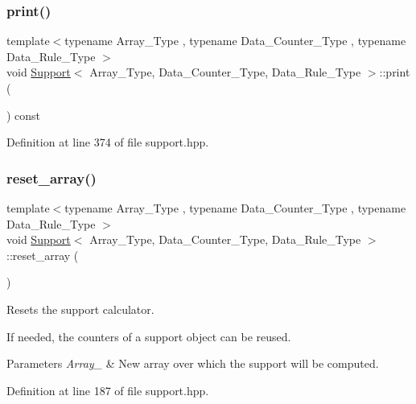 \subsubsection{\texorpdfstring{print()}{print()}}
{\footnotesize\ttfamily template$<$typename Array\+\_\+\+Type , typename Data\+\_\+\+Counter\+\_\+\+Type , typename Data\+\_\+\+Rule\+\_\+\+Type $>$ \\
void \hyperlink{class_support}{Support}$<$ Array\+\_\+\+Type, Data\+\_\+\+Counter\+\_\+\+Type, Data\+\_\+\+Rule\+\_\+\+Type $>$\+::print (\begin{DoxyParamCaption}{ }\end{DoxyParamCaption}) const\hspace{0.3cm}{\ttfamily [inline]}}



Definition at line 374 of file support.\+hpp.

\mbox{\label{class_support_a4f2860fd2e8e30703b91633a92ed7a58}} 
\subsubsection{\texorpdfstring{reset\+\_\+array()}{reset\_array()}\hspace{0.1cm}{\footnotesize\ttfamily [1/2]}}
{\footnotesize\ttfamily template$<$typename Array\+\_\+\+Type , typename Data\+\_\+\+Counter\+\_\+\+Type , typename Data\+\_\+\+Rule\+\_\+\+Type $>$ \\
void \hyperlink{class_support}{Support}$<$ Array\+\_\+\+Type, Data\+\_\+\+Counter\+\_\+\+Type, Data\+\_\+\+Rule\+\_\+\+Type $>$\+::reset\+\_\+array (\begin{DoxyParamCaption}{ }\end{DoxyParamCaption})\hspace{0.3cm}{\ttfamily [inline]}}



Resets the support calculator. 

If needed, the counters of a support object can be reused.


\begin{DoxyParams}{Parameters}
{\em Array\+\_\+} & New array over which the support will be computed. \\
\hline
\end{DoxyParams}


Definition at line 187 of file support.\+hpp.

